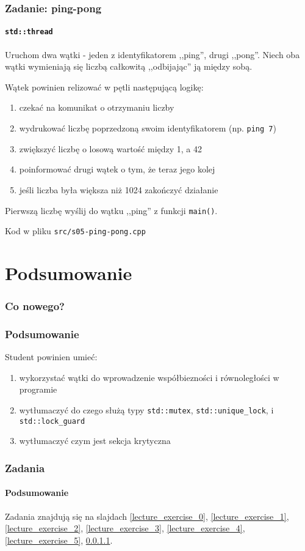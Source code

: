 \documentclass[aspectratio=169]{beamer}
\begin{document}
\begin{frame}[fragile]
    \frametitle{Zadanie: ping-pong}
    \framesubtitle{\texttt{std::thread}}
    \label{lecture_exercise_6}

    {\small
    Uruchom dwa wątki - jeden z identyfikatorem ,,ping'', drugi ,,pong''.
    Niech oba wątki wymieniają się liczbą całkowitą ,,odbijając'' ją między
    sobą.

    Wątek powinien relizować w pętli następującą logikę:
    \begin{enumerate}
        \item czekać na komunikat o otrzymaniu liczby
        \item wydrukować liczbę poprzedzoną swoim identyfikatorem (np.
            \texttt{ping 7})
        \item zwiększyć liczbę o losową wartość między 1, a 42
        \item poinformować drugi wątek o tym, że teraz jego kolej
        \item jeśli liczba była większa niż 1024 zakończyć działanie
    \end{enumerate}

    Pierwszą liczbę wyślij do wątku ,,ping'' z funkcji \texttt{main()}.

    \vspace{1em}

    Kod w pliku \texttt{src/s05-ping-pong.cpp}}
\end{frame}

\section{Podsumowanie}

\begin{frame}
    \frametitle{Co nowego?}
    \frametitle{Podsumowanie}

    Student powinien umieć:

    \begin{enumerate}
        \item wykorzystać wątki do wprowadzenie współbiezności i równoległości w
            programie
        \item wytłumaczyć do czego służą typy \texttt{std::mutex},
            \texttt{std::unique\_lock}, i \texttt{std::lock\_guard}
        \item wytłumaczyć czym jest sekcja krytyczna
    \end{enumerate}
\end{frame}

\begin{frame}
    \frametitle{Zadania}
    \framesubtitle{Podsumowanie}

    Zadania znajdują się na slajdach
    \ref{lecture_exercise_0},
    \ref{lecture_exercise_1},
    \ref{lecture_exercise_2},
    \ref{lecture_exercise_3},
    \ref{lecture_exercise_4},
    \ref{lecture_exercise_5},
    \ref{lecture_exercise_6}.
\end{frame}
\end{document}
